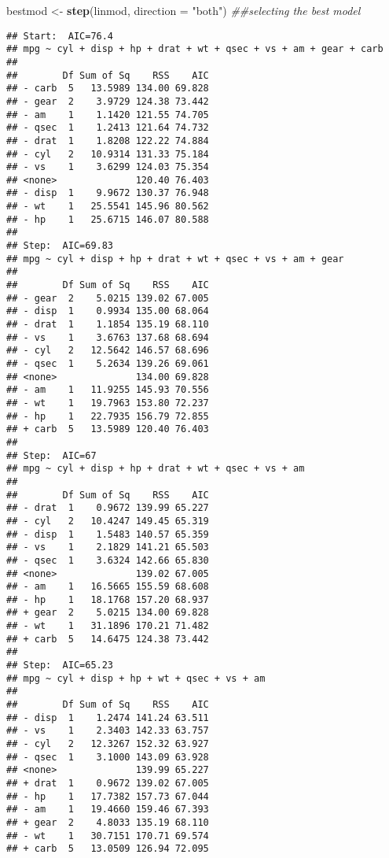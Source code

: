 \documentclass[
]{article}
\newenvironment{Shaded}{\begin{snugshade}}{\end{snugshade}}
\newcommand{\CommentTok}[1]{\textcolor[rgb]{0.56,0.35,0.01}{\textit{#1}}}
\newcommand{\DataTypeTok}[1]{\textcolor[rgb]{0.13,0.29,0.53}{#1}}
\newcommand{\KeywordTok}[1]{\textcolor[rgb]{0.13,0.29,0.53}{\textbf{#1}}}
\newcommand{\NormalTok}[1]{#1}
\newcommand{\StringTok}[1]{\textcolor[rgb]{0.31,0.60,0.02}{#1}}
\begin{document}
\begin{Shaded}
\begin{Highlighting}[]
\NormalTok{bestmod <-}\StringTok{ }\KeywordTok{step}\NormalTok{(linmod, }\DataTypeTok{direction =} \StringTok{"both"}\NormalTok{) }\CommentTok{##selecting the best model}
\end{Highlighting}
\end{Shaded}

\begin{verbatim}
## Start:  AIC=76.4
## mpg ~ cyl + disp + hp + drat + wt + qsec + vs + am + gear + carb
## 
##        Df Sum of Sq    RSS    AIC
## - carb  5   13.5989 134.00 69.828
## - gear  2    3.9729 124.38 73.442
## - am    1    1.1420 121.55 74.705
## - qsec  1    1.2413 121.64 74.732
## - drat  1    1.8208 122.22 74.884
## - cyl   2   10.9314 131.33 75.184
## - vs    1    3.6299 124.03 75.354
## <none>              120.40 76.403
## - disp  1    9.9672 130.37 76.948
## - wt    1   25.5541 145.96 80.562
## - hp    1   25.6715 146.07 80.588
## 
## Step:  AIC=69.83
## mpg ~ cyl + disp + hp + drat + wt + qsec + vs + am + gear
## 
##        Df Sum of Sq    RSS    AIC
## - gear  2    5.0215 139.02 67.005
## - disp  1    0.9934 135.00 68.064
## - drat  1    1.1854 135.19 68.110
## - vs    1    3.6763 137.68 68.694
## - cyl   2   12.5642 146.57 68.696
## - qsec  1    5.2634 139.26 69.061
## <none>              134.00 69.828
## - am    1   11.9255 145.93 70.556
## - wt    1   19.7963 153.80 72.237
## - hp    1   22.7935 156.79 72.855
## + carb  5   13.5989 120.40 76.403
## 
## Step:  AIC=67
## mpg ~ cyl + disp + hp + drat + wt + qsec + vs + am
## 
##        Df Sum of Sq    RSS    AIC
## - drat  1    0.9672 139.99 65.227
## - cyl   2   10.4247 149.45 65.319
## - disp  1    1.5483 140.57 65.359
## - vs    1    2.1829 141.21 65.503
## - qsec  1    3.6324 142.66 65.830
## <none>              139.02 67.005
## - am    1   16.5665 155.59 68.608
## - hp    1   18.1768 157.20 68.937
## + gear  2    5.0215 134.00 69.828
## - wt    1   31.1896 170.21 71.482
## + carb  5   14.6475 124.38 73.442
## 
## Step:  AIC=65.23
## mpg ~ cyl + disp + hp + wt + qsec + vs + am
## 
##        Df Sum of Sq    RSS    AIC
## - disp  1    1.2474 141.24 63.511
## - vs    1    2.3403 142.33 63.757
## - cyl   2   12.3267 152.32 63.927
## - qsec  1    3.1000 143.09 63.928
## <none>              139.99 65.227
## + drat  1    0.9672 139.02 67.005
## - hp    1   17.7382 157.73 67.044
## - am    1   19.4660 159.46 67.393
## + gear  2    4.8033 135.19 68.110
## - wt    1   30.7151 170.71 69.574
## + carb  5   13.0509 126.94 72.095

\end{verbatim}
\end{document}
